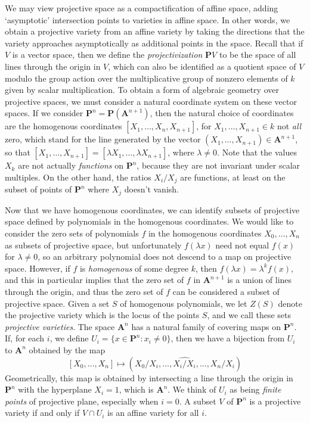 We may view projective space as a compactification of affine space, adding `asymptotic' intersection points to varieties in affine space. In other words, we obtain a projective variety from an affine variety by taking the directions that the variety approaches asymptotically as additional points in the space. Recall that if $V$ is a vector space, then we define the {\it projectivization} $\mathbf{P} V$ to be the space of all lines through the origin in $V$, which can also be identified as a quotient space of $V$ modulo the group action over the multiplicative group of nonzero elements of $k$ given by scalar multiplication. To obtain a form of algebraic geometry over projective spaces, we must consider a natural coordinate system on these vector spaces. If we consider $\mathbf{P}^n = \mathbf{P}(\mathbf{A}^{n+1})$, then the natural choice of coordinates are the homogenous coordinates $[X_1, \dots, X_n, X_{n+1}]$, for $X_1, \dots, X_{n+1} \in k$ not {\it all} zero, which stand for the line generated by the vector $(X_1, \dots, X_{n+1}) \in \mathbf{A}^{n+1}$, so that $[X_1, \dots, X_{n+1}] = [\lambda X_1, \dots, \lambda X_{n+1}]$, where $\lambda \neq 0$. Note that the values $X_k$ are not actually {\it functions} on $\mathbf{P}^n$, because they are not invariant under scalar multiples. On the other hand, the ratios $X_i/X_j$ are functions, at least on the subset of points of $\mathbf{P}^n$ where $X_j$ doesn't vanish.

Now that we have homogenous coordinates, we can identify subsets of projective space defined by polynomials in the homogenous coordinates. We would like to consider the zero sets of polynomials $f$ in the homogenous coordinates $X_0, \dots, X_n$ as subsets of projective space, but unfortunately $f(\lambda x)$ need not equal $f(x)$ for $\lambda \neq 0$, so an arbitrary polynomial does not descend to a map on projective space. However, if $f$ is {\it homogenous} of some degree $k$, then $f(\lambda x) = \lambda^k f(x)$, and this in particular implies that the zero set of $f$ in $\mathbf{A}^{n+1}$ is a union of lines through the origin, and thus the zero set of $f$ can be considered a subset of projective space. Given a set $S$ of homogenous polynomials, we let $Z(S)$ denote the projective variety which is the locus of the points $S$, and we call these sets \emph{projective varieties}. The space $\mathbf{A}^n$ has a natural family of covering maps on $\mathbf{P}^n$. If, for each $i$, we define $U_i = \{ x \in \mathbf{P}^n: x_i \neq 0 \}$, then we have a bijection from $U_i$ to $\mathbf{A}^n$ obtained by the map
%
\[ [X_0, \dots, X_n] \mapsto (X_0/X_i, \dots, \widehat{X_i/X_i} ,\dots, X_n/X_i) \]
%
Geometrically, this map is obtained by intersecting a line through the origin in $\mathbf{P}^n$ with the hyperplane $X_i = 1$, which is $\mathbf{A}^n$. We think of $U_i$ as being {\it finite points} of projective plane, especially when $i = 0$. A subset $V$ of $\mathbf{P}^n$ is a projective variety if and only if $V \cap U_i$ is an affine variety for all $i$.

